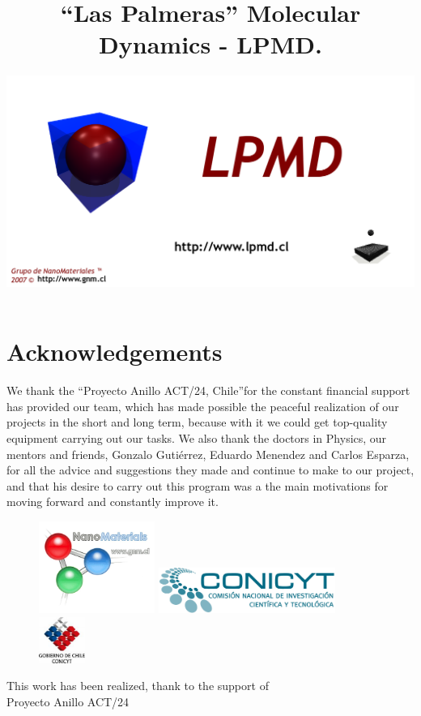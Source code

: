 \documentclass[a4paper,10pt]{scrbook}
\begin{document}
\author{\includegraphics[scale=.35]{../logo-front.png}}
\title{``Las Palmeras'' Molecular Dynamics - \textbf{LPMD}.}
\maketitle


\chapter*{Acknowledgements}

We thank the ``Proyecto Anillo ACT/24, Chile''for the constant financial
support has provided our team, which has made possible the peaceful realization
of our projects in the short and long term, because with it we could get
top-quality equipment carrying out our tasks. We also thank the doctors in
Physics, our mentors and friends, Gonzalo Gutiérrez, Eduardo Menendez and Carlos
Esparza, for all the advice and suggestions they made and continue to make to
our project, and that his desire to carry out this program was a the main
motivations for moving forward and constantly improve it.

\vfill
\begin{center}
\begin{figure}[!hbt]\centering
\includegraphics[height=3cm]{gnm.jpg}\hskip2cm
\includegraphics[height=1.5cm]{conicyt.jpg}
\includegraphics[height=1.5cm]{gob-chile.jpeg}
\end{figure}
\end{center}
\begin{flushright}
 This work has been realized, thank to the support of\\
 Proyecto Anillo ACT/24
\end{flushright}
\end{document}
